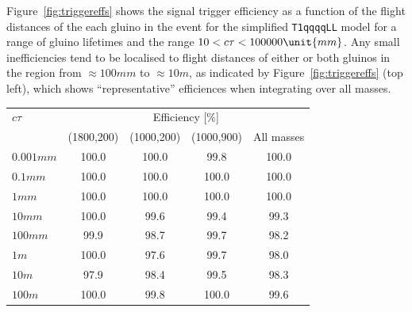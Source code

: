 Figure~\ref{fig:triggereffs} shows the signal trigger efficiency as a
function of the flight distances of the each gluino in the event for
the simplified \texttt{T1qqqqLL} model for a range of gluino lifetimes
and the range $10 < \ctau < 100000\unit{mm}$. Any small inefficiencies
tend to be localised to flight distances of either or both gluinos in
the region from ${\approx}100\unit{mm}$ to ${\approx}10\unit{m}$, as
indicated by Figure~\ref{fig:triggereffs} (top left), which shows
``representative'' efficiences when integrating over all masses.

\begin{table}[h!]
  \centering
  \begin{tabular}{lcccc} 
    \hline
    $c\tau$          & \multicolumn{4}{c}{Efficiency [\%]}               \\
    \cline{2-5}
                     & (1800,200) & (1000,200) & (1000,900) & All masses \\
    \hline
    $0.001\unit{mm}$ & 100.0      & 100.0      & 99.8       & 100.0      \\
    $0.1\unit{mm}$   & 100.0      & 100.0      & 100.0      & 100.0      \\
    $1\unit{mm}$     & 100.0      & 100.0      & 100.0      & 100.0      \\
    $10\unit{mm}$    & 100.0      & 99.6       & 99.4       & 99.3       \\
    $100\unit{mm}$   & 99.9       & 98.7       & 99.7       & 98.2       \\
    $1\unit{m}$      & 100.0      & 97.6       & 99.7       & 98.0       \\
    $10\unit{m}$     & 97.9       & 98.4       & 99.5       & 98.3       \\
    $100\unit{m}$    & 100.0      & 99.8       & 100.0      & 99.6       \\
    \hline
  \end{tabular}
  \label{tab:LLP-triggereff}
\end{table}

